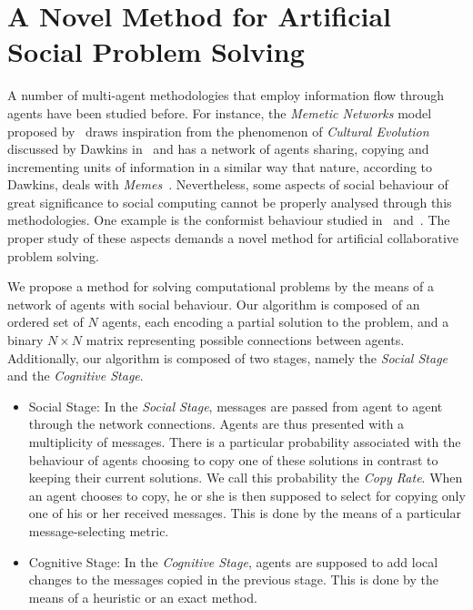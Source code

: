 \documentclass{article}
\begin{document}
\section{A Novel Method for Artificial Social Problem Solving}

A number of multi-agent methodologies that employ information flow through agents have been studied before. For instance, the {\em Memetic Networks} model proposed by~\cite{araujo:memenet} draws inspiration from the phenomenon of {\em Cultural Evolution} discussed by Dawkins in~\cite{dawkins:selfishgene} and has a network of agents sharing, copying and incrementing units of information in a similar way that nature, according to Dawkins, deals with {\em Memes}~\cite{dawkins:selfishgene}. Nevertheless, some aspects of social behaviour of great significance to social computing cannot be properly analysed through this methodologies. One example is the conformist behaviour studied in~\cite{cefferson:conformists} and~\cite{farenzena:collabem}. The proper study of these aspects demands a novel method for artificial collaborative problem solving.

We propose a method for solving computational problems by the means of a network of agents with social behaviour. Our algorithm is composed of an ordered set of $N$ agents, each encoding a partial solution to the problem, and a binary $N \times N$ matrix representing possible connections between agents. Additionally, our algorithm is composed of two stages, namely the {\em Social Stage} and the {\em Cognitive Stage}. 

\begin{itemize}
\item
Social Stage: In the {\em Social Stage}, messages are passed from agent to agent through the network connections. Agents are thus presented with a multiplicity of messages. There is a particular probability associated with the behaviour of agents choosing to copy one of these solutions in contrast to keeping their current solutions. We call this probability the {\em Copy Rate}. When an agent chooses to copy, he or she is then supposed to select for copying only one of his or her received messages. This is done by the means of a particular message-selecting metric.

\item
Cognitive Stage: In the {\em Cognitive Stage}, agents are supposed to add local changes to the messages copied in the previous stage. This is done by the means of a heuristic or an exact method.
\end{itemize}
\end{document}
